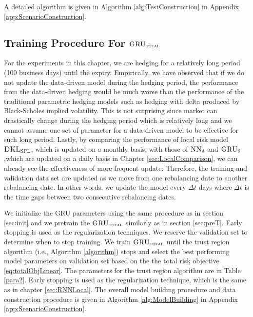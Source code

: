 \documentclass[letterpaper,12pt,titlepage,oneside,final]{book}
\numberwithin{equation}{section}
\theoremstyle{definition}
\newcommand{\model}{\textsc{GRU}_\delta}
\newcommand{\modelT}{\textsc{GRU}_{\textsc{total}}}
\newcommand{\modelN}{\textsc{NN}_\delta}
\newcommand{\DKLs}{\bf\textsc{DKL}_{\text{SPL}}}
\begin{document}
A detailed algorithm is given in Algorithm \ref{alg:TestConstruction} in Appendix \ref{app:ScenarioConstruction}.







\subsection{Training Procedure For $\modelT$}
\label{sec:TotalModelProcedure}
For the experiments in this chapter, we are hedging for a relatively long period (100 business days) until the expiry.  Empirically, we have observed that if we do not update the data-driven model during the hedging period, the performance from the data-driven hedging would be much worse than the performance of the traditional parametric hedging models such as hedging with delta produced by Black-Scholes implied volatility. This is not surprising since market can drastically change during the hedging period which is relatively long and we cannot assume one set of parameter for a data-driven model to be effective for such long period. Lastly, by comparing the performance of local risk model  $\DKLs$, which is updated on a monthly basis,  with those of $\modelN$ and $\model$ ,which are updated on a daily basis in Chapter \ref{sec:LocalComparison}, we can already see the effectiveness of more frequent update.  Therefore, the training and validation data set are updated as we move from one rebalancing date to another rebalancing date. In other words, we update the model every $\Delta t$ days where $\Delta t$ is the time gaps between two consecutive rebalancing dates.

We  initialize the  GRU parameters using the same procedure as in section \ref{sec:init} and we pretrain the $\modelT$ similarly as in section \ref{sec:preT}. Early stopping is used as the regularization techniques. We reserve the validation set to determine when to stop training. 
We train $\modelT$ until the trust region algorithm (i.e., Algorithm \ref{algorithm}) stops and select the best performing model parameters on validation set based on  the the total risk objective \eqref{eq:totalObjLinear}. The  parameters for the trust region algorithm are in Table \ref{para2}. Early stopping is used as the regularization technique, which is the same as in chapter \ref{sec:RNNLocal}. The overall model building procedure and data construction procedure is given in Algorithm \ref{alg:ModelBuilding} in Appendix \ref{app:ScenarioConstruction}.
\end{document}
